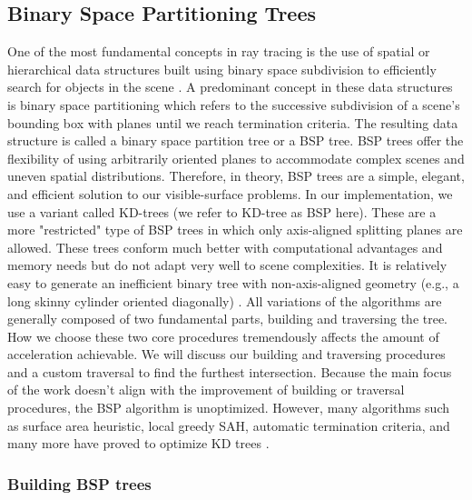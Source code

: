 \documentclass[a4paper,11pt,oneside]{article}
\begin{document}
\subsection{Binary Space Partitioning Trees}
\label{section:bsp-optimization}

One of the most fundamental concepts in ray tracing is the use of spatial or hierarchical data structures built using binary space subdivision to efficiently search for objects in the scene \cite{ray_tracing_BSP2}. A predominant concept in these data structures is binary space partitioning which refers to the successive subdivision of a scene's bounding box with planes until we reach termination criteria. The resulting data structure is called a binary space partition tree or a BSP tree. BSP trees offer the flexibility of using arbitrarily oriented planes to accommodate complex scenes and uneven spatial distributions. Therefore, in theory, BSP trees are a simple, elegant, and efficient solution to our visible-surface problems. In our implementation, we use a variant called KD-trees (we refer to KD-tree as BSP here). These are a more "restricted" type of BSP trees in which only axis-aligned splitting planes are allowed. These trees conform much better with computational advantages and memory needs but do not adapt very well to scene complexities. It is relatively easy to generate an inefficient binary tree with non-axis-aligned geometry (e.g., a long skinny cylinder oriented diagonally) \cite{ray_tracing_BSP}. All variations of the algorithms are generally composed of two fundamental parts, building and traversing the tree. How we choose these two core procedures tremendously affects the amount of acceleration achievable. We will discuss our building and traversing procedures and a custom traversal to find the furthest intersection. Because the main focus of the work doesn't align with the improvement of building or traversal procedures, the BSP algorithm is unoptimized. However, many algorithms such as surface area heuristic, local greedy SAH, automatic termination criteria, and many more have proved to optimize KD trees \cite{fast_building_kd_trees, parallel_kd_tree_construction}.

\subsubsection{Building BSP trees}
\end{document}
